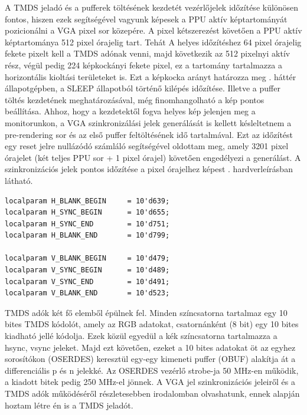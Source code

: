 	A TMDS jeladó és a pufferek töltésének kezdetét vezérlőjelek időzítése különösen fontos, hiszen ezek segítségével vagyunk képesek a PPU aktív képtartományát pozicionálni a VGA pixel sor közepére. A pixel kétszerezést követően a PPU aktív képtartománya 512 pixel órajelig tart. Tehát A helyes időzítéshez 64 pixel órajelig fekete pixelt kell a TMDS adónak venni, majd következik az 512 pixelnyi aktív rész, végül pedig 224 képkockányi fekete pixel, ez a tartomány tartalmazza a horizontális kioltási területeket is. Ezt a képkocka arányt határozza meg . háttér állapotgépben, a SLEEP állapotból történő kilépés időzítése. Illetve a puffer töltés kezdetének meghatározásával, még finomhangolható a kép pontos beállítása. Ahhoz, hogy a kezdetektől fogva helyes kép jelenjen meg a monitorunkon, a VGA szinkronizálási jelek generálását is kellett késleltetnem a pre-rendering sor és az első puffer feltöltésének idő tartalmával. Ezt az időzítést egy reset jelre nullázódó számláló segítségével oldottam meg, amely 3201 pixel órajelet (két teljes PPU sor + 1 pixel órajel) követően engedélyezi a generálást. A szinkronizációs jelek pontos időzítése a pixel órajelhez képest . hardverleírásban látható. 
	
\begin{lstlisting}[caption={A képgenerálás időzítési paraméterei}, label={code:vga-timing}, style=prettyverilog]
localparam H_BLANK_BEGIN     = 10'd639;
localparam H_SYNC_BEGIN      = 10'd655;
localparam H_SYNC_END        = 10'd751;
localparam H_BLANK_END       = 10'd799;

localparam V_BLANK_BEGIN     = 10'd479;
localparam V_SYNC_BEGIN      = 10'd489;
localparam V_SYNC_END        = 10'd491;
localparam V_BLANK_END       = 10'd523;\end{lstlisting}
	
	TMDS adók két fő elemből épülnek fel. Minden színcsatorna tartalmaz egy 10 bites TMDS kódolót, amely az RGB adatokat, csatornánként (8 bit) egy 10 bites kiadható jellé kódolja. Ezek közül egyedül a kék színcsatorna tartalmazza a hsync, vsync jeleket. Majd ezt követően, ezeket a 10 bites adatokat öt az egyhez sorosítókon (OSERDES) keresztül egy-egy kimeneti puffer (OBUF) alakítja át a differenciális p és n jelekké. Az OSERDES vezérlő strobe-ja 50 MHz-en működik, a kiadott bitek pedig 250 MHz-el jönnek. A VGA jel szinkronizációs jeleiről és a TMDS adók működéséről részletesebben   irodalomban olvashatunk, ennek alapján hoztam létre én is a TMDS jeladót.

